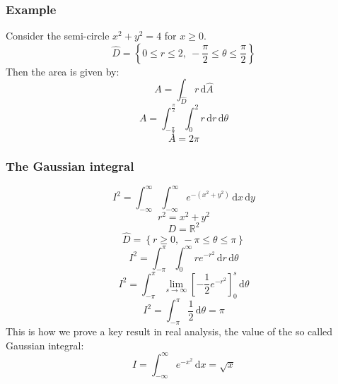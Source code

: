 \documentclass[12pt]{article}
\begin{document}
\subsubsection*{Example}
Consider the semi-circle \(x^2+y^2=4\) for \(x\geq 0\).
\[\hat{D}=\left\{0\leq r\leq 2,\  -\frac{\pi}{2}\leq \theta\leq \frac{\pi}{2}\right\}\]
Then the area is given by:
\[A=\int_{\hat{D}} r\,\text{d}\hat{A}\]
\[A=\int^{\frac{\pi}{2}}_{-\frac{\pi}{2}}\int^2_0 r\,\text{d}r\,\text{d}\theta\]
\[A=2\pi\]
\subsubsection*{The Gaussian integral}
\[I^2=\int^\infty_{-\infty}\int^\infty_{-\infty}e^{-(x^2+y^2)}\,\text{d}x\,\text{d}y\]
\[r^2=x^2+y^2\]
\[D=\mathbb{R}^2\]
\[\hat{D}=\left\{r\geq 0, \ -\pi\leq \theta\leq \pi\right\}\]
\[I^2=\int^\pi_{-\pi}\int^\infty_0re^{-r^2}\,\text{d}r\,\text{d}\theta\]
\[I^2=\int^\pi_{-\pi}\lim_{s\to\infty}\left[-\frac{1}{2}e^{-r^2}\right]^s_0\,\text{d}\theta\]
\[I^2=\int^\pi_{-\pi}\frac{1}{2}\,\text{d}\theta=\pi\]
This is how we prove a key result in real analysis, the value of the so called Gaussian integral:
\[I=\int^\infty_{-\infty}e^{-x^2}\,\text{d}x=\sqrt{x}\]
\end{document}
